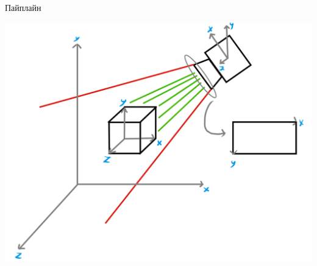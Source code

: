 \documentclass{beamer}
\begin{document}
\begin{frame}{Пайплайн}
\begin{center}
\includegraphics[width=0.86 \linewidth]{coord_systems.png}
\end{center}
\end{frame}
\end{document}
